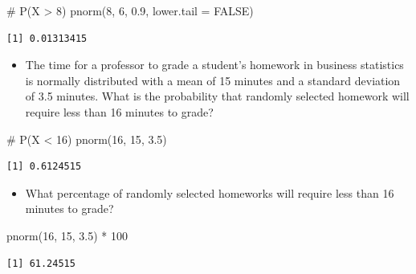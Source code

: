 \documentclass[
  letterpaper,
  DIV=11,
  numbers=noendperiod]{scrreprt}
\newenvironment{Shaded}{\begin{snugshade}}{\end{snugshade}}
\newcommand{\AttributeTok}[1]{\textcolor[rgb]{0.40,0.45,0.13}{#1}}
\newcommand{\CommentTok}[1]{\textcolor[rgb]{0.37,0.37,0.37}{#1}}
\newcommand{\ConstantTok}[1]{\textcolor[rgb]{0.56,0.35,0.01}{#1}}
\newcommand{\DecValTok}[1]{\textcolor[rgb]{0.68,0.00,0.00}{#1}}
\newcommand{\FloatTok}[1]{\textcolor[rgb]{0.68,0.00,0.00}{#1}}
\newcommand{\FunctionTok}[1]{\textcolor[rgb]{0.28,0.35,0.67}{#1}}
\newcommand{\NormalTok}[1]{\textcolor[rgb]{0.00,0.23,0.31}{#1}}
\newcommand{\SpecialCharTok}[1]{\textcolor[rgb]{0.37,0.37,0.37}{#1}}
\providecommand{\tightlist}{%
  \setlength{\itemsep}{0pt}\setlength{\parskip}{0pt}}\usepackage{longtable,booktabs,array}
\begin{document}
\begin{Shaded}
\begin{Highlighting}[]
\CommentTok{\# P(X \textgreater{} 8)}
\FunctionTok{pnorm}\NormalTok{(}\DecValTok{8}\NormalTok{, }\DecValTok{6}\NormalTok{, }\FloatTok{0.9}\NormalTok{, }\AttributeTok{lower.tail =} \ConstantTok{FALSE}\NormalTok{)}
\end{Highlighting}
\end{Shaded}

\begin{verbatim}
[1] 0.01313415
\end{verbatim}

\begin{itemize}
\tightlist
\item
  The time for a professor to grade a student's homework in business
  statistics is normally distributed with a mean of 15 minutes and a
  standard deviation of 3.5 minutes. What is the probability that
  randomly selected homework will require less than 16 minutes to grade?
\end{itemize}

\begin{Shaded}
\begin{Highlighting}[]
\CommentTok{\# P(X \textless{} 16)}
\FunctionTok{pnorm}\NormalTok{(}\DecValTok{16}\NormalTok{, }\DecValTok{15}\NormalTok{, }\FloatTok{3.5}\NormalTok{)}
\end{Highlighting}
\end{Shaded}

\begin{verbatim}
[1] 0.6124515
\end{verbatim}

\begin{itemize}
\tightlist
\item
  What percentage of randomly selected homeworks will require less than
  16 minutes to grade?
\end{itemize}

\begin{Shaded}
\begin{Highlighting}[]
\FunctionTok{pnorm}\NormalTok{(}\DecValTok{16}\NormalTok{, }\DecValTok{15}\NormalTok{, }\FloatTok{3.5}\NormalTok{) }\SpecialCharTok{*} \DecValTok{100}
\end{Highlighting}
\end{Shaded}

\begin{verbatim}
[1] 61.24515
\end{verbatim}
\end{document}
